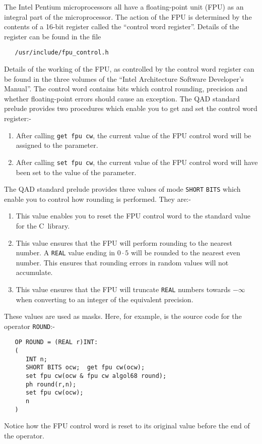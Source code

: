 The Intel Pentium microprocessors all have a floating-point unit (FPU)
as an integral part of the microprocessor. The action of the FPU is
determined by the contents of a 16-bit register called the ``control
word register''. Details of the register can be found in the file
\begin{verbatim}
   /usr/include/fpu_control.h
\end{verbatim}
\noindent
Details of the working of the FPU, as controlled by the control word
register can be found in the three volumes of the ``Intel Architecture
Software Developer's Manual''. The control word contains bits
which control rounding, precision and whether floating-point errors
should cause an exception. The QAD standard prelude provides two
procedures which enable you to get and set the control word register:-
\begin{enumerate}
\item {}\newline
After calling \verb|get fpu cw|, the current value of the FPU control
word will be assigned to the parameter.
\item {}\newline
After calling \verb|set fpu cw|, the current value of the FPU control
word will have been set to the value of the parameter.
\end{enumerate}
The QAD standard prelude provides three values of mode \verb|SHORT|
\verb|BITS| which enable you to control how rounding is performed.
They are:-
\begin{enumerate}
\item {}\newline
This value enables you to reset the FPU control word to the standard
value for the C~library.
\item {}\newline
This value ensures that the FPU will perform rounding to the nearest
number. A \verb|REAL| value ending in $0\cdot5$ will be rounded to the
nearest even number. This ensures that rounding errors in random values
will not accumulate.
\item {}\newline
This value ensures that the FPU will truncate \verb|REAL| numbers
towards $-\infty$ when converting to an integer of the equivalent
precision.
\end{enumerate}
These values are used as masks. Here, for example, is the source code
for the operator \verb|ROUND|:-
\begin{verbatim}
   OP ROUND = (REAL r)INT:
   (
      INT n;
      SHORT BITS ocw;  get fpu cw(ocw);
      set fpu cw(ocw & fpu cw algol68 round);
      ph round(r,n);
      set fpu cw(ocw);
      n
   )
\end{verbatim}
\noindent
Notice how the FPU control word is reset to its original value before
the end of the operator.

